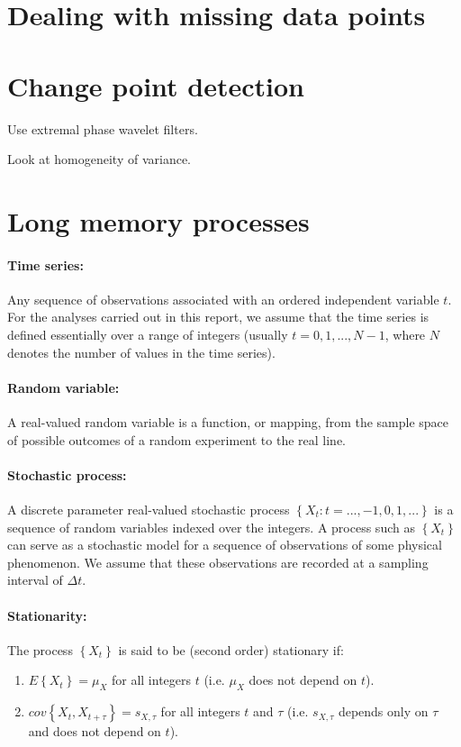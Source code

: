 \documentclass[main.tex]{subfiles}
\begin{document}
\section{Dealing with missing data points}

\section{Change point detection}

Use extremal phase wavelet filters.

Look at homogeneity of variance.

\section{Long memory processes}

\paragraph{Time series:} Any sequence of observations associated with an ordered independent variable $t$. For the analyses carried out in this report, we assume that the time series is defined essentially over a range of integers (usually $t = 0 , 1 , ... , N - 1$, where $N$ denotes the number of values in the time series).

\paragraph{Random variable:} A real-valued random variable is a function, or mapping, from the sample space of possible outcomes of a random experiment to the real line.

\paragraph{Stochastic process:} A discrete parameter real-valued stochastic process $\left\{ X_t : t = ... , -1 , 0 , 1 , ... \right\}$ is a sequence of random variables indexed over the integers. A process such as $\left\{ X_t \right\}$ can serve as a stochastic model for a sequence of observations of some physical phenomenon. We assume that these observations are recorded at a sampling interval of $\Delta t$.

\paragraph{Stationarity:} The process $\left\{ X_t \right\} $ is said to be (second order) stationary if:
\begin{enumerate}
\item $E \left\{ X_t \right\} = \mu_X$ for all integers $t$ (i.e. $\mu_X$ does not depend on $t$).
\item $cov \left\{ X_t , X_{t + \tau} \right\} = s_{X , \tau}$ for all integers $t$ and $\tau$ (i.e. $s_{X , \tau}$ depends only on $\tau$ and does not depend on $t$).
\end{enumerate}
\end{document}
